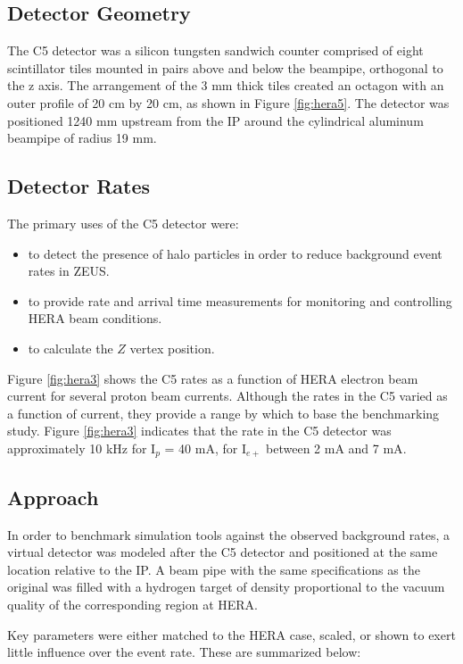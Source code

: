 \subsection{Detector Geometry}

The C5 detector was a silicon tungsten sandwich counter comprised of eight scintillator tiles mounted in pairs above and below the beampipe, orthogonal to the z axis.  The arrangement of the 3 mm thick tiles created an octagon with an outer profile of 20 cm by 20 cm, as shown in Figure \ref{fig:hera5}.  The detector was positioned 1240 mm upstream from the IP around the cylindrical aluminum beampipe of radius 19 mm.  

\subsection{Detector Rates}
The primary uses of the C5 detector were:
\begin{itemize}
	\item to detect the presence of halo particles in order to reduce background event rates in ZEUS.
	\item to provide rate and arrival time measurements for monitoring and controlling HERA beam conditions.
	\item to calculate the $Z$ vertex position.
\end{itemize}
Figure \ref{fig:hera3} shows the C5 rates as a function of HERA electron beam current for several proton beam currents.  Although the rates in the C5 varied as a function of current, they provide a range by which to base the benchmarking study.  Figure \ref{fig:hera3} indicates that the rate in the C5 detector was approximately 10 kHz for I$_{p}$ = 40 mA, for I$_{e+}$ between 2 mA and 7 mA\cite{Furletova:2015pma}. 

\subsection{Approach}

In order to benchmark simulation tools against the observed background rates, a virtual detector was modeled after the C5 detector and positioned at the same location relative to the IP.  A beam pipe with the same specifications as the original was filled with a hydrogen target of density proportional to the vacuum quality of the corresponding region at HERA.  

Key parameters were either matched to the HERA case, scaled, or shown to exert little influence over the event rate.  These are summarized below:

